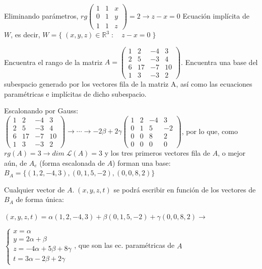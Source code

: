 \noindent Eliminando parámetros, $rg \left( \begin{matrix} 1&1&x\\0&1&y\\1&1&z \end{matrix} \right)=2 \to z-x=0$ Ecuación implícita de $W$, es decir, $W=\{\; (x,y,z)\in \mathbb R^3\; : \quad z-x=0 \; \}$


\begin{miejercicio}
	
	Encuentra el rango de la matriz \footnotesize{$A=\left( \begin{matrix} 1&2&-4&3\\2&5&-3&4\\6&17&-7&10\\1&3&-3&2 \end{matrix} \right)$}\normalsize{.} Encuentra una base del subespacio generado por los vectores fila de la matriz A, así como las ecuaciones paramétricas e implícitas de dicho subespacio.
\end{miejercicio}

	Escalonando por Gauss: $\left( \begin{matrix} 1&2&-4&3\\2&5&-3&4\\6&17&-7&10\\1&3&-3&2 \end{matrix} \right) \to \cdots \to -2\beta+2\gamma\left( \begin{matrix} 1&2&-4&3\\0&1&5&-2\\0&0&8&2\\0&0&0&0\end{matrix} \right)$, por lo que, como $rg(A)=3 \to  dim\; \mathcal L(A)=3$ y los tres primeros vectores fila de $A$, o mejor aún, de $A_e$ (forma escalonada de $A$) forman una base: $B_A=\{ (1,2,-4,3),(0,1,5,-2),(0,0,8,2) \}$

\noindent Cualquier vector de $A.\; (x,y,z,t) $ se podrá escribir en función de los vectores de $B_A$ de forma única:

\noindent $ (x,y,z,t)=\alpha (1,2,-4,3) + \beta (0,1,5,-2) +\gamma (0,0,8,2) \to$

\noindent $ \begin{cases}x=\alpha \\ y=2\alpha+\beta \\z=-4\alpha+5\beta+8\gamma \\ t=3\alpha-2\beta +2\gamma \end{cases} $, que son las ec. paramétricas de $A$

